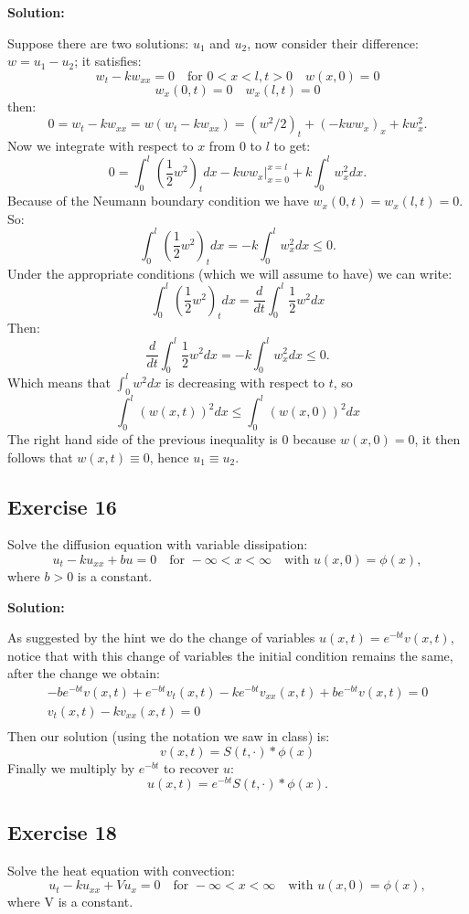 \documentclass{article}
\begin{document}
\textbf{Solution:}

Suppose there are two solutions: $u_1$ and $u_2$, now consider their
difference: $w=u_1-u_2$; it satisfies:
\[
    w_t -kw_{xx}=0 \quad \text{for } 0<x<l,t>0 \quad w(x,0)=0
\]
\[
w_x(0,t)=0\quad w_x(l,t)=0
\]
then:
\[
0=w_t-kw_{xx}=w(w_t-kw_{xx})=(w^2/2)_t+(-kww_x)_x+kw_x^2.
\]
Now we integrate with respect to $x$ from 0 to $l$ to get:
\[
0=\int_0^l\left(\frac{1}{2}w^2\right)_tdx-kww_x\Big|_{x=0}^{x=l}+k\int_0^lw_x^2dx.
\]
Because of the Neumann boundary condition we have $w_x(0,t)=w_x(l,t)=0$. So:
\[
\int_0^l\left(\frac{1}{2}w^2\right)_tdx=-k\int_0^lw_x^2dx\leq 0.
\]
Under the appropriate conditions (which we will assume to have) we can write:
\[
\int_0^l\left(\frac{1}{2}w^2\right)_tdx=\frac{d}{dt}\int_0^l\frac{1}{2}w^2dx
\]
Then:
\[
\frac{d}{dt}\int_0^l\frac{1}{2}w^2dx=-k\int_0^lw_x^2dx\leq 0.
\]
Which means that $\int_0^lw^2dx$ is decreasing with respect to $t$, so
\[
\int_0^l(w(x,t))^2dx\leq\int_0^l(w(x,0))^2dx
\]
The right hand side of the previous inequality is 0 because $w(x,0)=0$, it then
follows that $w(x,t)\equiv 0$, hence $u_1\equiv u_2$.
\subsection{Exercise 16}
Solve the diffusion equation with variable dissipation:
\[
    u_t-ku_{xx}+bu=0\quad \text{for }-\infty<x<\infty \quad \text{with } u(x,0)=\phi(x),
\]
where $b>0$ is a constant.

\textbf{Solution:}

As suggested by the hint we do the change of variables $u(x,t)=e^{-bt}v(x,t)$,
notice that with this change of variables the initial condition remains the
same, after the change we obtain:
\begin{align*}
-be^{-bt}v(x,t)+e^{-bt}v_t(x,t)-ke^{-bt}v_{xx}(x,t)+be^{-bt}v(x,t)=0\\
v_t(x,t)-kv_{xx}(x,t)=0\\
\end{align*}
Then our solution (using the notation we saw in class) is:
\[
v(x,t)=S(t,\cdot)\ast \phi(x)
\]
Finally we multiply by $e^{-bt}$ to recover $u$:
\[
    u(x,t)=e^{-bt}S(t,\cdot)\ast \phi(x).
\]
\subsection{Exercise 18}
Solve the heat equation with convection:
\[
u_t-ku_{xx}+Vu_x=0\quad \text{for }-\infty<x<\infty \quad \text{with } u(x,0)=\phi(x),
\]
where V is a constant.
\end{document}
